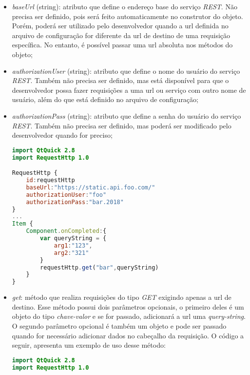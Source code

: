 \begin{itemize}
	\item \textit{baseUrl} (string): atributo que define o endereço base do serviço \textit{REST}. Não precisa ser definido, pois será feito automaticamente no construtor do objeto. Porém, poderá ser utilizado pelo desenvolvedor quando a url definida no arquivo de configuração for diferente da url de destino de uma requisição específica. No entanto, é possível passar uma url absoluta nos métodos do objeto;

	\item \textit{authorizationUser} (string): atributo que define o nome do usuário do serviço \textit{REST}. Também não precisa ser definido, mas está disponível para que o desenvolvedor possa fazer requisições a uma url ou serviço com outro nome de usuário, além do que está definido no arquivo de configuração;

	\item \textit{authorizationPass} (string): atributo que define a senha do usuário do serviço \textit{REST}. Também não precisa ser definido, mas poderá ser modificado pelo desenvolvedor quando for preciso;

\begin{center}
\begin{lstlisting}[language=qml]
import QtQuick 2.8
import RequestHttp 1.0

RequestHttp {
	id:requestHttp
	baseUrl:"https://static.api.foo.com/"
	authorizationUser:"foo"
	authorizationPass:"bar.2018"
}
...
Item {
	Component.onCompleted:{
		var queryString = {
			arg1:"123",
			arg2:"321"
		}
		requestHttp.get("bar",queryString)
	}
}
\end{lstlisting}
\end{center}

	\item \textit{get}: método que realiza requisições do tipo \textit{GET} exigindo apenas a url de destino. Esse método possui dois parâmetros opcionais, o primeiro deles é um objeto do tipo \textit{chave-valor} e se for passado, adicionará a url uma \textit{query-string}. O segundo parâmetro opcional é também um objeto e pode ser passado quando for necessário adicionar dados no cabeçalho da requisição. O código a seguir, apresenta um exemplo de uso desse método:
\begin{center}
\begin{lstlisting}[language=qml]
import QtQuick 2.8
import RequestHttp 1.0


\end{lstlisting}
\end{center}
\end{itemize}
